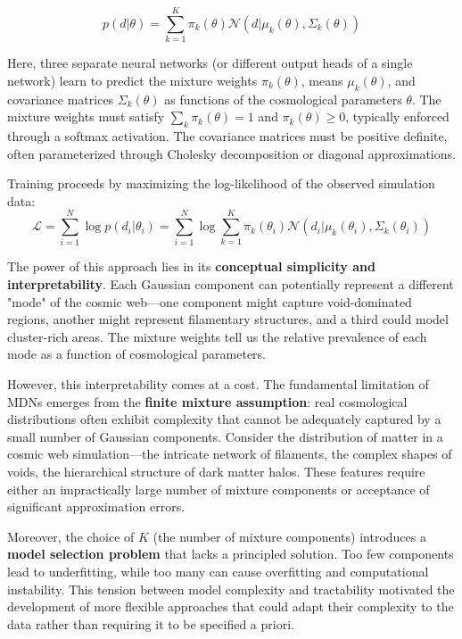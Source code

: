 \documentclass{SciPost}
\begin{document}
\begin{equation}
    p(d|\theta) = \sum_{k=1}^K \pi_k(\theta) \mathcal{N}(d | \mu_k(\theta), \Sigma_k(\theta))
\end{equation}

Here, three separate neural networks (or different output heads of a single network) learn to predict the mixture weights $\pi_k(\theta)$, means $\mu_k(\theta)$, and covariance matrices $\Sigma_k(\theta)$ as functions of the cosmological parameters $\theta$. The mixture weights must satisfy $\sum_k \pi_k(\theta) = 1$ and $\pi_k(\theta) \geq 0$, typically enforced through a softmax activation. The covariance matrices must be positive definite, often parameterized through Cholesky decomposition or diagonal approximations.

Training proceeds by maximizing the log-likelihood of the observed simulation data:
\begin{equation}
    \mathcal{L} = \sum_{i=1}^N \log p(d_i|\theta_i) = \sum_{i=1}^N \log \sum_{k=1}^K \pi_k(\theta_i) \mathcal{N}(d_i | \mu_k(\theta_i), \Sigma_k(\theta_i))
\end{equation}

The power of this approach lies in its \textbf{conceptual simplicity and interpretability}. Each Gaussian component can potentially represent a different "mode" of the cosmic web—one component might capture void-dominated regions, another might represent filamentary structures, and a third could model cluster-rich areas. The mixture weights tell us the relative prevalence of each mode as a function of cosmological parameters.

However, this interpretability comes at a cost. The fundamental limitation of MDNs emerges from the \textbf{finite mixture assumption}: real cosmological distributions often exhibit complexity that cannot be adequately captured by a small number of Gaussian components. Consider the distribution of matter in a cosmic web simulation—the intricate network of filaments, the complex shapes of voids, the hierarchical structure of dark matter halos. These features require either an impractically large number of mixture components or acceptance of significant approximation errors.

Moreover, the choice of $K$ (the number of mixture components) introduces a \textbf{model selection problem} that lacks a principled solution. Too few components lead to underfitting, while too many can cause overfitting and computational instability. This tension between model complexity and tractability motivated the development of more flexible approaches that could adapt their complexity to the data rather than requiring it to be specified a priori.
\end{document}
